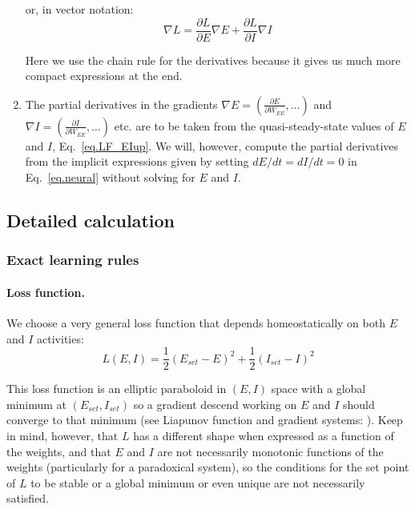 \documentclass[twocolumn]{article}
\newcommand{\set}{\mathit{set}}
\begin{document}
\begin{enumerate}
\noindent or, in vector notation:
\begin{equation}
\nabla L = \frac{\partial L}{\partial E} \nabla E + \frac{\partial L}{\partial I} \nabla I
\label{eq.LF_partial}
\end{equation}

\noindent Here we use the chain rule for the derivatives because it gives us much more compact expressions at the end.

\item The partial derivatives in the gradients $\displaystyle \nabla E = \left(\frac{\partial E}{\partial W_{EE}}, \ldots \right)$ and $\displaystyle \nabla I = \left( \frac{\partial I}{\partial W_{EE}}, \ldots \right)$ etc. are to be taken from the quasi-steady-state values of $E$ and $I$, Eq.\ \ref{eq.LF_EIup}. We will, however, compute the partial derivatives from the implicit expressions given by setting $dE/dt=dI/dt=0$ in Eq.\ \ref{eq.neural} without solving for $E$ and $I$.
\end{enumerate}


\subsection{Detailed calculation}

\subsubsection{Exact learning rules}

\paragraph{Loss function.}

We choose a very general loss function that depends homeostatically on both $E$ and $I$ activities:
\begin{equation}
L(E,I) = \frac{1}{2}(E_{set} - E)^2 + \frac{1}{2}(I_{set} - I)^2
\label{eq.LF_energy}
\end{equation}

\noindent This loss function is an elliptic paraboloid in $(E,I)$ space with a global minimum at $(E_{\set},I_{\set})$ so a gradient descend working on $E$ and $I$ should converge to that minimum (see Liapunov function and gradient systems: \cite[Section 1.1B]{Wiggins1996}\cite[Sections 9.3 and 9.4]{Hirsch1974}\cite[Section 7.2]{Strogatz2018}). Keep in mind, however, that $L$ has a different shape when expressed as a function of the weights, and that $E$ and $I$ are not necessarily monotonic functions of the weights (particularly for a paradoxical system), so the conditions for the set point of $L$ to be stable or a global minimum or even unique are not necessarily satisfied.
\end{document}
